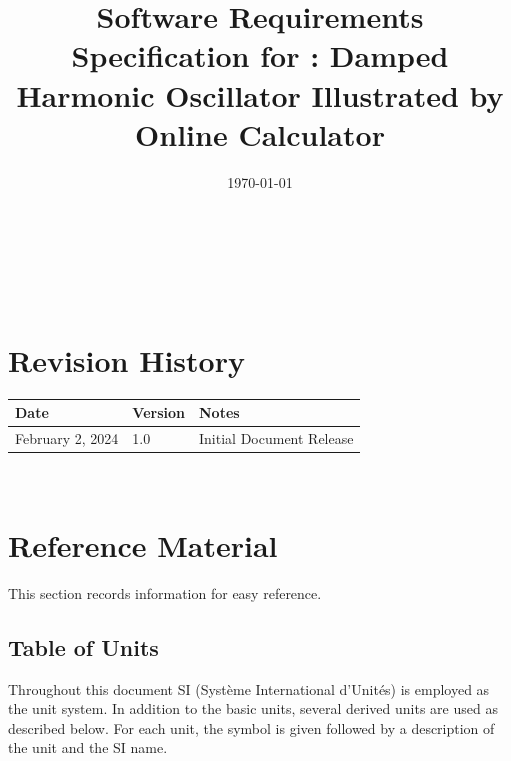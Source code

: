 \documentclass[12pt]{article}
\begin{document}
\title{Software Requirements Specification for \progname:
Damped Harmonic Oscillator Illustrated by Online Calculator} 
\author{\authname}
\date{\today}
	
\maketitle

~\newpage


\tableofcontents

~\newpage

\section*{Revision History}

\begin{tabularx}{\textwidth}{p{3cm}p{2cm}X}
\toprule {\bf Date} & {\bf Version} & {\bf Notes}\\
\midrule
February 2, 2024 & 1.0 & Initial Document Release\\
\bottomrule
\end{tabularx}

~\newpage

\section{Reference Material}

This section records information for easy reference.

\subsection{Table of Units}

Throughout this document SI (Syst\`{e}me International d'Unit\'{e}s) is employed
as the unit system.  In addition to the basic units, several derived units are
used as described below.  For each unit, the symbol is given followed by a
description of the unit and the SI name.
~\newline
\end{document}
